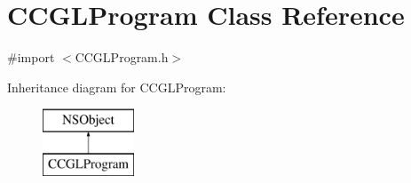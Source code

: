 \hypertarget{interface_c_c_g_l_program}{\section{C\-C\-G\-L\-Program Class Reference}
\label{interface_c_c_g_l_program}
}


{\ttfamily \#import $<$C\-C\-G\-L\-Program.\-h$>$}

Inheritance diagram for C\-C\-G\-L\-Program\-:\begin{figure}[H]
\begin{center}
\leavevmode
\includegraphics[height=2.000000cm]{interface_c_c_g_l_program}
\end{center}
\end{figure}
